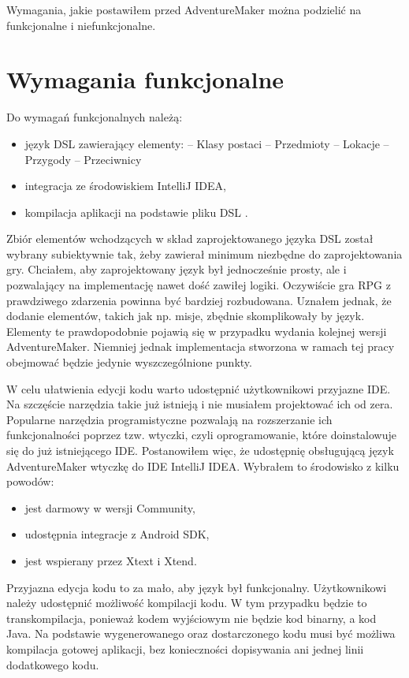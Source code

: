 \documentclass[openright]{xmgr}
\begin{document}
Wymagania, jakie postawiłem przed AdventureMaker można podzielić na funkcjonalne i niefunkcjonalne.

\section{Wymagania funkcjonalne}
Do wymagań funkcjonalnych należą:
\begin{itemize}
\item język DSL zawierający elementy:
\subitem -- Klasy postaci
\subitem -- Przedmioty
\subitem -- Lokacje
\subitem -- Przygody
\subitem -- Przeciwnicy
\item integracja ze środowiskiem IntelliJ IDEA,
\item kompilacja aplikacji na podstawie pliku DSL .
\end{itemize}

Zbiór elementów wchodzących w skład zaprojektowanego języka DSL został wybrany subiektywnie tak, żeby zawierał minimum niezbędne do zaprojektowania gry. Chciałem, aby zaprojektowany język był jednocześnie prosty, ale i pozwalający na implementację nawet dość zawiłej logiki. Oczywiście gra RPG z prawdziwego zdarzenia powinna być bardziej rozbudowana. Uznałem jednak, że dodanie elementów, takich jak np. misje, zbędnie skomplikowały by język. Elementy te prawdopodobnie pojawią się w przypadku wydania kolejnej wersji AdventureMaker. Niemniej jednak implementacja stworzona w ramach tej pracy obejmować będzie jedynie wyszczególnione punkty.

W celu ułatwienia edycji kodu warto udostępnić użytkownikowi przyjazne IDE. Na szczęście narzędzia takie już istnieją i nie musiałem projektować ich od zera. Popularne narzędzia programistyczne pozwalają na rozszerzanie ich funkcjonalności poprzez tzw. wtyczki, czyli oprogramowanie, które doinstalowuje się do już istniejącego IDE. Postanowiłem więc, że udostępnię obsługującą język AdventureMaker wtyczkę do IDE IntelliJ IDEA. Wybrałem to środowisko z kilku powodów:
\begin{itemize}	
\item jest darmowy w wersji Community,
\item udostępnia integracje z Android SDK,
\item jest wspierany przez Xtext i Xtend.
\end{itemize}

Przyjazna edycja kodu to za mało, aby język był funkcjonalny. Użytkownikowi należy udostępnić możliwość kompilacji kodu. W tym przypadku będzie to transkompilacja, ponieważ kodem wyjściowym nie będzie kod binarny, a kod Java. Na podstawie wygenerowanego oraz dostarczonego kodu musi być możliwa kompilacja gotowej aplikacji, bez konieczności dopisywania ani jednej linii dodatkowego kodu. 
\end{document}
